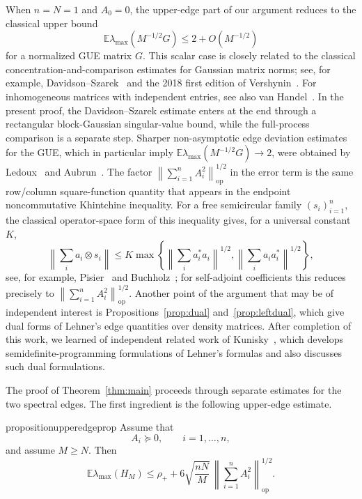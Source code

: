 \documentclass{article}
\newcommand{\E}{\mathbb E}
\newcommand{\op}{\mathrm{op}}
\newcommand{\Arow}{\left\|\sum_{i=1}^n A_i^2\right\|_{\op}^{1/2}}
\begin{document}
When $n=N=1$ and $A_0=0$, the upper-edge part of our argument reduces to the
classical upper bound
\[
	\E\lambda_{\max}(M^{-1/2}G)
	\le 2+O(M^{-1/2})
\]
for a normalized GUE matrix $G$.  This scalar case is closely related to the
classical concentration-and-comparison estimates for Gaussian matrix norms; see,
for example, Davidson--Szarek~\cite[Section~II.c]{DavidsonSzarek2001} and the
2018 first edition of
Vershynin~\cite[Section~7.3]{Vershynin}.
For inhomogeneous matrices with independent entries, see also
van Handel~\cite[Section~4]{vanHandel2017SpectralNorm}.  In the present proof,
the Davidson--Szarek estimate enters at the end through a rectangular
block-Gaussian singular-value bound, while the full-process comparison is a
separate step.  Sharper non-asymptotic edge deviation estimates for the GUE,
which in particular imply
$\E\lambda_{\max}(M^{-1/2}G)\to2$, were obtained by
Ledoux~\cite{LedouxLargestEigenvalues} and Aubrun~\cite{AubrunLargestEigenvalue}.
The factor \(\Arow\) in the error term is the same row/column square-function
quantity that appears in the endpoint noncommutative Khintchine inequality.  For
a free semicircular family \((s_i)_{i=1}^n\), the classical operator-space form
of this inequality gives, for a universal constant \(K\),
\[
	\left\|\sum_i a_i\otimes s_i\right\|
	\le
	K\max\left\{
	\left\|\sum_i a_i^*a_i\right\|^{1/2},
	\left\|\sum_i a_ia_i^*\right\|^{1/2}
	\right\},
\]
see, for example, Pisier~\cite[(9.9.8)--(9.9.9)]{PisierOperatorSpace} and
Buchholz~\cite[Remark~1]{BuchholzKhintchine}; for self-adjoint coefficients
this reduces precisely to \(\Arow\).
Another point of the argument that may be of independent interest is
Propositions~\ref{prop:dual} and~\ref{prop:leftdual}, which give dual forms of
Lehner's edge quantities over density matrices.  After completion of this work,
we learned of independent related work of Kunisky~\cite{KuniskyLehnerSDP2026},
which develops semidefinite-programming formulations of Lehner's formulas and
also discusses such dual formulations.

The proof of Theorem~\ref{thm:main} proceeds through separate estimates for the
two spectral edges.  The first ingredient is the following upper-edge estimate.

\begin{restatable*}{proposition}{upperedgeprop}
	\label{prop:upperedge}
	Assume that
	\[
		A_i\succeq0,\qquad i=1,\ldots,n,
	\]
	and assume $M\ge N$.  Then
	\[
		\E\lambda_{\max}(H_M)
		\le
		\rho_++6\sqrt{\frac{nN}{M}}\,\Arow.
	\]
\end{restatable*}
\end{document}
